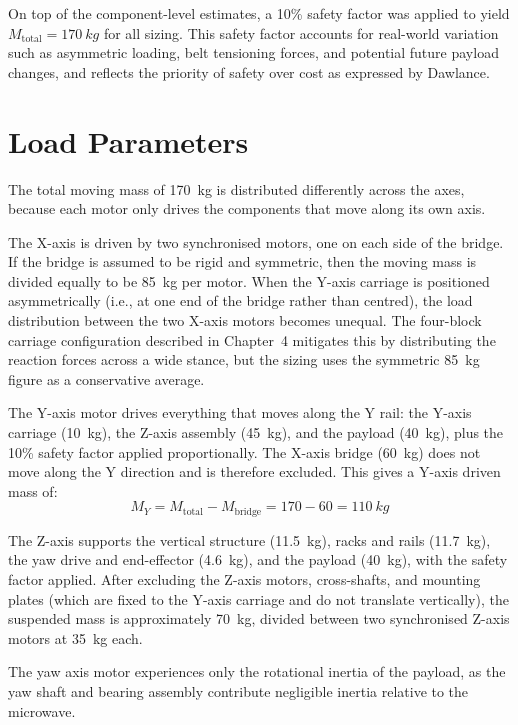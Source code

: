 On top of the component-level estimates, a 10\% safety factor was applied to yield $M_\text{total} = \SI{170}{kg}$ for all sizing. This safety factor accounts for real-world variation such as asymmetric loading, belt tensioning forces, and potential future payload changes, and reflects the priority of safety over cost as expressed by Dawlance.

\section{Load Parameters}

The total moving mass of \SI{170}{kg} is distributed differently across the axes, because each motor only drives the components that move along its own axis.

The X-axis is driven by two synchronised motors, one on each side of the bridge. If the bridge is assumed to be rigid and symmetric, then the moving mass is divided equally to be \SI{85}{kg} per motor. When the Y-axis carriage is positioned asymmetrically (i.e., at one end of the bridge rather than centred), the load distribution between the two X-axis motors becomes unequal. The four-block carriage configuration described in Chapter~4 mitigates this by distributing the reaction forces across a wide stance, but the sizing uses the symmetric \SI{85}{kg} figure as a conservative average.

The Y-axis motor drives everything that moves along the Y rail: the Y-axis carriage (\SI{10}{kg}), the Z-axis assembly (\SI{45}{kg}), and the payload (\SI{40}{kg}), plus the 10\% safety factor applied proportionally. The X-axis bridge (\SI{60}{kg}) does not move along the Y direction and is therefore excluded. This gives a Y-axis driven mass of:
\[
M_Y = M_\text{total} - M_\text{bridge} = 170 - 60 = \SI{110}{kg}
\]

The Z-axis supports the vertical structure (\SI{11.5}{kg}), racks and rails (\SI{11.7}{kg}), the yaw drive and end-effector (\SI{4.6}{kg}), and the payload (\SI{40}{kg}), with the safety factor applied. After excluding the Z-axis motors, cross-shafts, and mounting plates (which are fixed to the Y-axis carriage and do not translate vertically), the suspended mass is approximately \SI{70}{kg}, divided between two synchronised Z-axis motors at \SI{35}{kg} each.

The yaw axis motor experiences only the rotational inertia of the payload, as the yaw shaft and bearing assembly contribute negligible inertia relative to the microwave.

